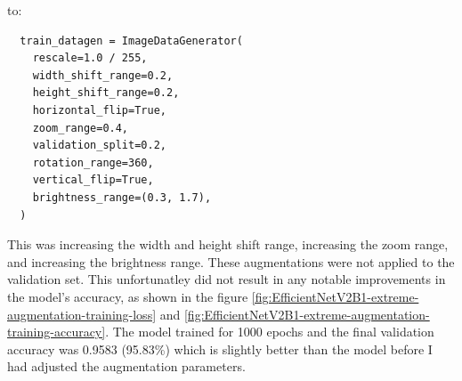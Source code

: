 \documentclass[]{final_report}
\begin{document}
to:

\begin{lstlisting}
  train_datagen = ImageDataGenerator(
    rescale=1.0 / 255,
    width_shift_range=0.2,
    height_shift_range=0.2,
    horizontal_flip=True,
    zoom_range=0.4,
    validation_split=0.2,
    rotation_range=360,
    vertical_flip=True,
    brightness_range=(0.3, 1.7),
  )
\end{lstlisting}

This was increasing the width and height shift range, increasing the zoom range, and increasing the brightness range. These augmentations were not applied to the validation set. This unfortunatley did not result in any notable improvements in the model's accuracy, as shown in the figure \ref{fig:EfficientNetV2B1-extreme-augmentation-training-loss} and \ref{fig:EfficientNetV2B1-extreme-augmentation-training-accuracy}. The model trained for 1000 epochs and the final validation accuracy was 0.9583 (95.83\%) which is slightly better than the model before I had adjusted the augmentation parameters.
\end{document}
